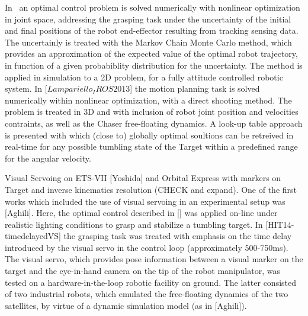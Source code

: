 In~\cite{Flores-Abad} an optimal control problem is solved numerically with nonlinear optimization in joint space, addressing the grasping task under the uncertainty of the initial and final positions of the robot end-effector resulting from tracking sensing data. The uncertainly is treated with the Markov Chain Monte Carlo method, which provides an approximation of the expected value of the optimal robot trajectory, in function of a given probabiblity distribution for the uncertainty. The method is applied in simulation to a 2D problem, for a fully attitude controlled robotic system. In [$Lampariello_IROS2013$] the motion planning task is solved numerically within nonlinear optimization, with a direct shooting method. The problem is treated in 3D and with inclusion of robot joint position and velocities contraints, as well as the Chaser free-floating dynamics. A look-up table approach is presented with which (close to) globally optimal soultions can be retreived in real-time for any possible tumbling state of the Target within a predefined range for the angular velocity. 

Visual Servoing on ETS-VII [Yoshida] and Orbital Express with markers on Target and inverse kinematics resolution (CHECK and expand). One of the first works which included the use of visual servoing in an experimental setup was [Aghili]. Here, the optimal control described in [] was applied on-line under realistic lighting conditions to grasp and stabilize a tumbling target. In [HIT14-timedelayedVS] the grasping task was treated with emphasis on the time delay introduced by the visual servo in the control loop (approximately 500-750ms). The visual servo, which provides pose information between a visual marker on the target and the eye-in-hand camera on the tip of the robot manipulator, was tested on a hardware-in-the-loop robotic facility on ground. The latter consisted of two industrial robots, which emulated the free-floating dynamics of the two satellites, by virtue of a dynamic simulation model (as in [Aghili]). 


